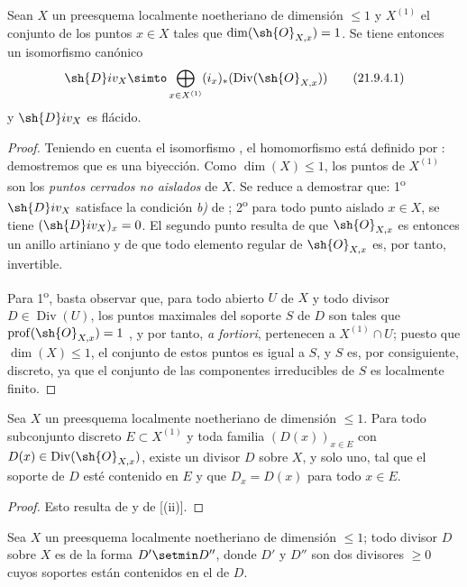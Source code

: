 \begin{proposition}[21.9.4]
\label{IV.21.9.4}
Sean $X$ un preesquema localmente noetheriano de dimensión $\leq1$ y $X^{(1)}$ el conjunto de los puntos $x\in X$ tales que $\dim(\sh{O}_{X,x})=1$.
Se tiene entonces un isomorfismo canónico
\[
\label{IV.21.9.4.1}
  \sh{D}iv_X\simto\bigoplus_{x\in X^{(1)}}(i_x)_*(\operatorname{Div}(\sh{O}_{X,x}))
  \tag{21.9.4.1}
\]
y $\sh{D}iv_X$ es flácido.
\end{proposition}

\begin{proof}
Teniendo en cuenta el isomorfismo , el homomorfismo  está definido por :
demostremos que es una biyección.
Como $\dim(X)\leq1$, los puntos de $X^{(1)}$ son los \emph{puntos cerrados no aislados} de $X$.
Se reduce a demostrar que:
1\textsuperscript{o} $\sh{D}iv_X$ satisface la condición \emph{b)} de ;
2\textsuperscript{o} para todo punto aislado $x\in X$, se tiene $(\sh{D}iv_X)_x=0$.
El segundo punto resulta de que $\sh{O}_{X,x}$ es entonces un anillo artiniano y de que todo elemento regular de $\sh{O}_{X,x}$ es, por tanto, invertible.

Para 1\textsuperscript{o}, basta observar que, para todo abierto $U$ de $X$ y todo divisor $D\in\operatorname{Div}(U)$, los puntos maximales del soporte $S$ de $D$ son tales que 
$\operatorname{prof}(\sh{O}_{X,x})=1$ , y por tanto, \emph{a fortiori}, pertenecen a $X^{(1)}\cap U$;
puesto que $\dim(X)\leq1$, el conjunto de estos puntos es igual a $S$, y $S$ es, por consiguiente, discreto, ya que el conjunto de las componentes irreducibles de $S$ es localmente finito.
\end{proof}

\begin{corollary}[21.9.5]
\label{IV.21.9.5}
Sea $X$ un preesquema localmente noetheriano de dimensión $\leq1$.
Para todo subconjunto discreto $E\subset X^{(1)}$ y toda familia $(D(x))_{x\in E}$ con $D(x)\in\operatorname{Div}(\sh{O}_{X,x})$, existe un divisor $D$ sobre $X$, y solo uno, tal que el soporte de $D$ esté contenido en $E$ y que $D_x=D(x)$ para todo $x\in E$.
\end{corollary}

\begin{proof}
Esto resulta de  y de [(ii)].
\end{proof}

\begin{corollary}[21.9.6]
\label{IV.21.9.6}
Sea $X$ un preesquema localmente noetheriano de dimensión $\leq1$;
todo divisor $D$ sobre $X$ es de la forma $D'\setmin D''$, donde $D'$ y $D''$ son dos divisores $\geq0$ cuyos soportes están contenidos en el de $D$.
\end{corollary}

